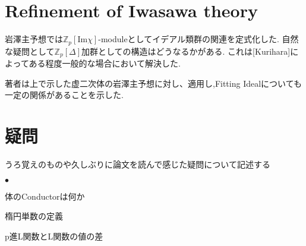 \documentclass{ujarticle}
\renewenvironment{itemize}%
{%
   \begin{list}{\parbox{1zw}{$\bullet$}}%
   {%
      \setlength{\topsep}{0zh}
      \setlength{\itemindent}{0zw}
      \setlength{\leftmargin}{2zw}%
      \setlength{\rightmargin}{0zw}%
      \setlength{\labelsep}{1zw}%
      \setlength{\labelwidth}{3zw}%
      \setlength{\itemsep}{0em}%
      \setlength{\parsep}{0em}%
      \setlength{\listparindent}{0zw}%
   }
}{%
   \end{list}%
}
\begin{document}
\section{Refinement of Iwasawa theory}
\label{sec:Refinement of Iwasawa theory}
岩澤主予想では$\mathbb{Z}_p[\mathrm{Im}\chi]$-moduleとしてイデアル類群の関連を定式化した.
自然な疑問として$\mathbb{Z}_p[\Delta]$加群としての構造はどうなるかがある.
これは[Kurihara]によってある程度一般的な場合において解決した.

著者は上で示した虚二次体の岩澤主予想に対し、適用し,Fitting Idealについても一定の関係があることを示した.

\section{疑問}
\label{sec:疑問}
うろ覚えのものや久しぶりに論文を読んで感じた疑問について記述する
\begin{itemize}
  \item 体のConductorは何か
  \item 楕円単数の定義
  \item p進L関数とL関数の値の差
  \item
\end{itemize}
\end{document}
